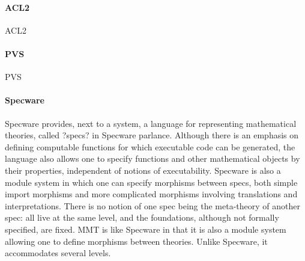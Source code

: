 \documentclass[12pt]{article}
\newcommand{\system}[2][]{\paragraph{#2}#2 \ifnonempty[\cite{#2}]{#1}{\cite{#1}}}
\begin{document}
\system{ACL2}

\system{PVS}

\system{Specware} provides, next to a system, a language for representing mathematical theories, called ?specs? in Specware parlance.  Although there is an emphasis on defining computable functions for which executable code can be generated, the language also allows one to specify functions and other mathematical objects by their properties, independent of notions of executability.  Specware is also a module system in which one can specify morphisms between specs, both simple import morphisms and more complicated morphisms involving translations and interpretations.  There is no notion of one spec being the meta-theory of another spec: all live at the same level, and the foundations, although not formally specified, are fixed.
MMT is like Specware in that it is also a module system allowing one to define morphisms between theories.  Unlike Specware, it accommodates several levels.



\end{document}
